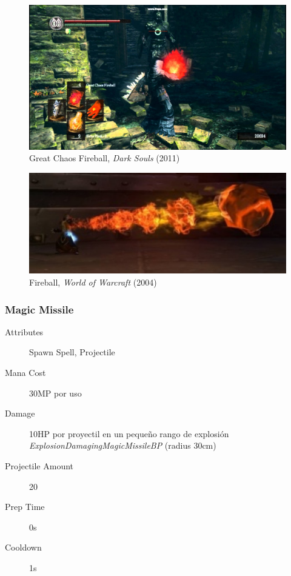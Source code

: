 \documentclass[12pt]{report}
\begin{document}
\begin{figure}[H]
    \centering
    \includegraphics[width=1\textwidth]{great_chaos_fireball}
	\captionsetup{labelformat=empty}
    \caption{Great Chaos Fireball, \textit{Dark Souls} (2011)}
\end{figure}

\begin{figure}[H]
    \centering
    \includegraphics[width=1\textwidth]{fireball_wow}
	\captionsetup{labelformat=empty}
    \caption{Fireball, \textit{World of Warcraft} (2004)}
\end{figure}

\newpage
\subsubsection{Magic Missile}

\begin{description}
	\item[Attributes] Spawn Spell, Projectile
	\item[Mana Cost] 30MP por uso
	\item[Damage] 10HP por proyectil en un pequeño rango de explosión \textit{ExplosionDamagingMagicMissileBP} (radius 30cm)
	\item[Projectile Amount] 20
	\item[Prep Time] 0s
	\item[Cooldown] 1s
\end{description}
\end{document}
